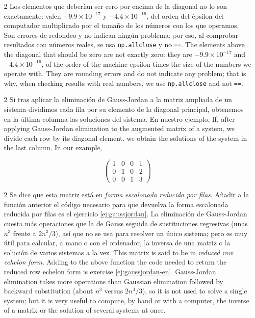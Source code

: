 \begin{paracol}{2}
Los elementos que deberían ser cero por encima de la diagonal no lo son exactamente: valen $-9.9\times10^{-17}$ y $-4.4\times10^{-16}$, del orden del épsilon del computador multiplicado por el tamaño de los números con los que operamos. Son errores de redondeo y no indican ningún problema; por eso, al comprobar resultados con números reales, se usa \texttt{np.allclose} y no \texttt{==}.
\switchcolumn
The elements above the diagonal that should be zero are not exactly zero: they are $-9.9\times10^{-17}$ and $-4.4\times10^{-16}$, of the order of the machine epsilon times the size of the numbers we operate with. They are rounding errors and do not indicate any problem; that is why, when checking results with real numbers, we use \texttt{np.allclose} and not \texttt{==}.
\end{paracol}

\begin{paracol}{2}
Si tras aplicar la eliminación de Gauss-Jordan a la matriz ampliada de un sistema dividimos cada fila por su elemento de la diagonal principal, obtenemos en la última columna las soluciones del sistema. En nuestro ejemplo,
\switchcolumn
If, after applying Gauss-Jordan elimination to the augmented matrix of a system, we divide each row by its diagonal element, we obtain the solutions of the system in the last column. In our example,
\end{paracol}
\begin{equation*}
\begin{pmatrix}
1&     0&     0&    1\\
 0&    1&    0&    2\\
 0&     0&     1&    3
\end{pmatrix}
\end{equation*}

\begin{paracol}{2}
Se dice que esta matriz está en \emph{forma escalonada reducida por filas}. Añadir a la función anterior el código necesario para que devuelva la forma escalonada reducida por filas es el ejercicio \ref{ej:gaussjordan}. La eliminación de Gauss-Jordan cuesta más operaciones que la de Gauss seguida de sustituciones regresivas (unas $n^3$ frente a $2n^3/3$), así que no se usa para resolver un único sistema; pero es muy útil para calcular, a mano o con el ordenador, la inversa de una matriz o la solución de varios sistemas a la vez.
\switchcolumn
This matrix is said to be in \emph{reduced row echelon form}. Adding to the above function the code needed to return the reduced row echelon form is exercise \ref{ej:gaussjordan-en}. Gauss-Jordan elimination takes more operations than Gaussian elimination followed by backward substitution (about $n^3$ versus $2n^3/3$), so it is not used to solve a single system; but it is very useful to compute, by hand or with a computer, the inverse of a matrix or the solution of several systems at once.
\end{paracol}

